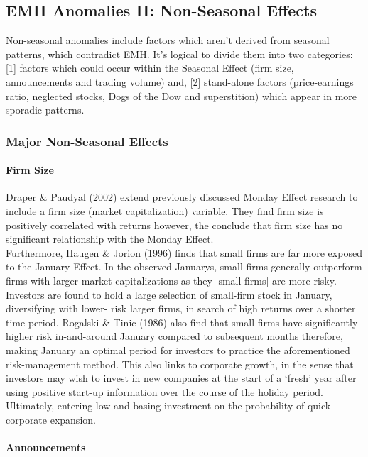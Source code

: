 \documentclass[11pt, english]{article}
\begin{document}
	\subsection{EMH Anomalies II: Non-Seasonal Effects}

	Non-seasonal anomalies include factors which aren’t derived from seasonal patterns, which contradict EMH. It’s logical to divide them into two categories: [1] factors which could occur within the Seasonal Effect (firm size, announcements and trading volume) and, [2] stand-alone factors (price-earnings ratio, neglected stocks, Dogs of the Dow and superstition) which appear in more sporadic patterns.

		\subsubsection{Major Non-Seasonal Effects}

			\paragraph{Firm Size}

			Draper \& Paudyal (2002) extend previously discussed Monday Effect research to include a firm size (market capitalization) variable. They find firm size is positively correlated with returns however, the conclude that firm size has no significant relationship with the Monday Effect.\\

			Furthermore, Haugen \& Jorion (1996) finds that small firms are far more exposed to the January Effect. In the observed Januarys, small firms generally outperform firms with larger market capitalizations as they [small firms] are more risky. Investors are found to hold a large selection of small-firm stock in January, diversifying with lower- risk larger firms, in search of high returns over a shorter time period. Rogalski \& Tinic (1986) also find that small firms have significantly higher risk in-and-around January compared to subsequent months therefore, making January an optimal period for investors to practice the aforementioned risk-management method. This also links to corporate growth, in the sense that investors may wish to invest in new companies at the start of a `fresh' year after using positive start-up information over the course of the holiday period. Ultimately, entering low and basing investment on the probability of quick corporate expansion.

			\paragraph{Announcements}
\end{document}

